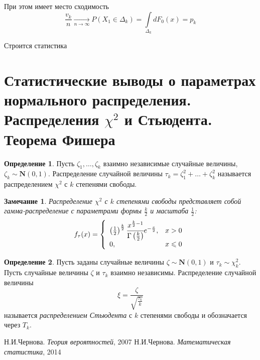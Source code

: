 \documentclass[oneside,final,14pt]{extreport}
\newtheorem*{rmrk}{Замечание}
\theoremstyle{definition}
\newtheorem{defn}{Определение}[section]
\begin{document}
При этом имеет место сходимость
\begin{equation*}
    \frac{v_k}{n} \xrightarrow[n \to \infty]{} P\left(X_{1} \in \Delta_{k}\right)=\int\limits_{\Delta_{k}} d F_{0}(x)=p_{k}
\end{equation*}

Строится статистика

\section{Статистические выводы о параметрах нормального распределения. Распределения $\chi^{2}$ и Стьюдента. Теорема Фишера}

\begin{defn}
    Пусть $\zeta_{1}, \ldots, \zeta_{k}$ взаимно независимые случайные величины, $\zeta_{k} \sim \mathbf{N}(0,1)$. Распределение случайной величины $\tau_{k}=\zeta_{1}^{2}+\ldots+\zeta_{k}^{2}$ называется распределением $\chi^{2}$ с $k$ степенями свободы.
\end{defn}
\begin{rmrk}
    Распределение $\chi^{2}$ с $k$ степенями свободы представляет собой гамма-распределение с параметрами формы $\frac{k}{2}$ и масштаба $\frac{1}{2}$:
    \begin{equation*}
    f_{\tau}(x)=\left\{\begin{array}{ll}
        \left(\frac{1}{2}\right)^{\frac{k}{2}} \cfrac{x^{\frac{k}{2}-1}}{\Gamma\left(\frac{k}{2}\right)} e^{-\frac{x}{2}}, & x>0 \\
        0, & x \leqslant 0
    \end{array}\right.
    \end{equation*}
\end{rmrk}

\begin{defn}
    Пусть заданы случайные величины $\zeta \sim \mathbf{N}(0,1)$ и $\tau_{k} \sim \chi_{k}^{2}$. Пусть случайные величины $\zeta$ и $\tau_{k}$ взаимно независимы. Распределение случайной величины 
    \begin{equation*}
        \xi=\frac{\zeta}{\sqrt{\frac{\tau_{k}}{k}}}
    \end{equation*}
    называется {\it распределением Стьюдента} с $k$ степенями свободы и обозначается через $T_{k}$.
\end{defn}

\begin{thebibliography}{1}
		Н.И.Чернова.
		{\it Теория вероятностей},
		2007
		Н.И.Чернова.
		{\it Математическая статистика},
		2014
\end{thebibliography}
\end{document}
